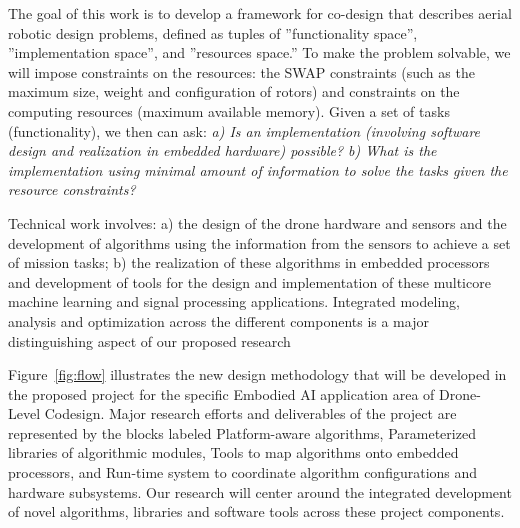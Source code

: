 The goal of this work is to develop a framework for co-design that describes
aerial robotic design problems, defined as tuples of ''functionality space'',
''implementation space'', and ''resources space.'' To make the problem solvable, we will impose constraints on the resources: the SWAP constraints (such as the maximum size, weight and configuration of rotors) and constraints on the computing resources (maximum available memory). Given a set of tasks (functionality), we then can ask: {\it a) Is an implementation (involving software design and realization in embedded hardware) possible? b)  What is the implementation using minimal amount of information to solve the tasks given the resource constraints?}




Technical work involves: a) the  design  of  the  drone  hardware  and  sensors and the development of algorithms using the information from the sensors  to achieve a set of mission tasks; b) the realization of these algorithms in embedded processors and development of tools for the design and implementation of these multicore machine learning and signal processing applications. Integrated modeling, analysis and optimization across the different components  is  a  major  distinguishing  aspect  of  our  proposed  research

Figure~\ref{fig:flow} illustrates the new design methodology
that will be developed in the proposed project for the
specific Embodied AI application area of Drone-Level Codesign.
Major research efforts and deliverables
of the project are represented by the
blocks labeled Platform-aware algorithms, 
Parameterized libraries of algorithmic modules, 
Tools to map algorithms onto embedded processors,
and
Run-time system to coordinate algorithm configurations and hardware subsystems.
Our research will center around the integrated development of novel algorithms, 
libraries and software tools across these project components.


